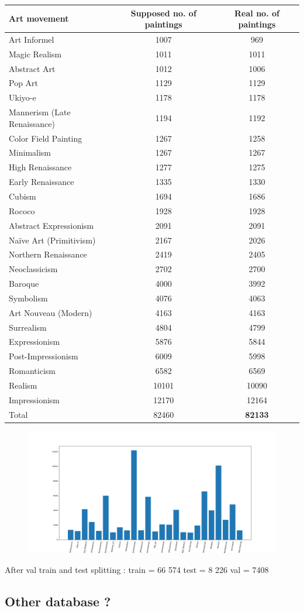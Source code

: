 \begin{tabularx}{14cm}{|X|c|c|} 
	\hline
	\textbf{Art movement} & \textbf{Supposed no. of paintings} & \textbf{Real no. of paintings}\\
	\hline
	Art Informel & 1007 & 969 \\
	\hline
	Magic Realism & 1011 & 1011\\
	\hline
	Abstract Art & 1012 & 1006\\
	\hline
	Pop Art & 1129 & 1129\\
	\hline
	Ukiyo-e & 1178 & 1178\\
	\hline
	Mannerism (Late Renaissance) & 1194 & 1192\\
	\hline
	Color Field Painting  & 1267 & 1258\\
	\hline
	Minimalism & 1267 & 1267\\
	\hline
	High Renaissance & 1277 & 1275 \\
	\hline
	Early Renaissance & 1335 & 1330\\
	\hline
	Cubism & 1694 & 1686\\
	\hline
	Rococo & 1928 & 1928\\
	\hline
	Abstract Expressionism & 2091 & 2091\\
	\hline
	Naïve Art (Primitivism) & 2167 & 2026\\
	\hline
	Northern Renaissance & 2419 & 2405\\
	\hline
	Neoclassicism & 2702 & 2700\\
	\hline
	Baroque & 4000 & 3992\\
	\hline
	Symbolism & 4076 & 4063\\
	\hline
	Art Nouveau (Modern) & 4163 & 4163\\
	\hline
	Surrealism & 4804 & 4799\\
	\hline
	Expressionism & 5876 & 5844\\
	\hline
	Post-Impressionism & 6009 & 5998\\
	\hline
	Romanticism & 6582 & 6569\\
	\hline
	Realism & 10101 & 10090\\
	\hline
	Impressionism & 12170 & 12164\\
	\hline
	Total & 82460 & \textbf{82133}\\
	\hline
\end{tabularx}

\begin{figure}
	\includegraphics[scale = 0.3]{images/wp_distrib.png}
\end{figure}


After val train and test splitting : 
train = 66 574
test = 8 226
val = 7408

\subsection{Other database ?}